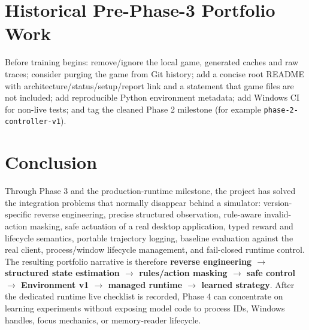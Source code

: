\documentclass[11pt,a4paper]{article}
\begin{document}
\section{Historical Pre-Phase-3 Portfolio Work}
Before training begins: remove/ignore the local game, generated caches and raw traces; consider purging the game from Git history; add a concise root README with architecture/status/setup/report link and a statement that game files are not included; add reproducible Python environment metadata; add Windows CI for non-live tests; and tag the cleaned Phase 2 milestone (for example \texttt{phase-2-controller-v1}).
\section{Conclusion}
Through Phase 3 and the production-runtime milestone, the project has solved the integration problems that normally disappear behind a simulator: version-specific reverse engineering, precise structured observation, rule-aware invalid-action masking, safe actuation of a real desktop application, typed reward and lifecycle semantics, portable trajectory logging, baseline evaluation against the real client, process/window lifecycle management, and fail-closed runtime control. The resulting portfolio narrative is therefore \textbf{reverse engineering $\rightarrow$ structured state estimation $\rightarrow$ rules/action masking $\rightarrow$ safe control $\rightarrow$ Environment v1 $\rightarrow$ managed runtime $\rightarrow$ learned strategy}. After the dedicated runtime live checklist is recorded, Phase 4 can concentrate on learning experiments without exposing model code to process IDs, Windows handles, focus mechanics, or memory-reader lifecycle.
\end{document}
